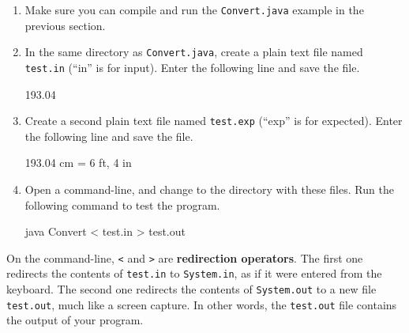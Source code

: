 \documentclass[12pt]{book}
\theoremstyle{exercise}
\newcommand{\java}[1]{\verb"#1"}
\newcommand{\java}[1]{\lstinline{#1}} %
\begin{document}
\begin{enumerate}

\item Make sure you can compile and run the {\tt Convert.java} example in the previous section.

\item In the same directory as {\tt Convert.java}, create a plain text file named {\tt test.in} (``in'' is for input).
Enter the following line and save the file.

\begin{stdout}
193.04
\end{stdout}

\item Create a second plain text file named {\tt test.exp} (``exp'' is for expected).
Enter the following line and save the file.

\begin{stdout}
193.04 cm = 6 ft, 4 in
\end{stdout}


\item Open a command-line, and change to the directory with these files.
Run the following command to test the program.

\begin{stdout}
java Convert < test.in > test.out
\end{stdout}

\end{enumerate}


On the command-line, {\tt <} and {\tt >} are {\bf redirection operators}.
The first one redirects the contents of {\tt test.in} to \java{System.in}, as if it were entered from the keyboard.
The second one redirects the contents of \java{System.out} to a new file {\tt test.out}, much like a screen capture.
In other words, the {\tt test.out} file contains the output of your program.


\end{document}
